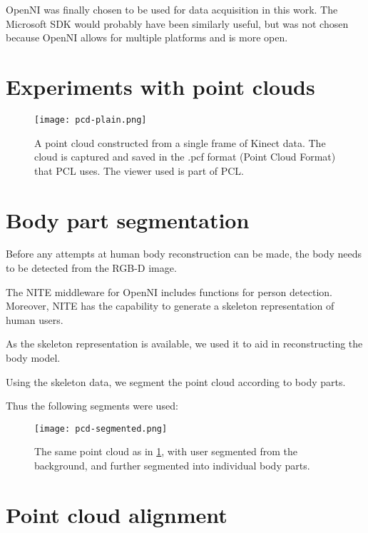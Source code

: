 OpenNI was finally chosen to be used for data acquisition in this work. The Microsoft SDK would probably have been similarly useful, but was not chosen because OpenNI allows for multiple platforms and is more open.

\section{Experiments with point clouds}

\begin{figure}
    \centering
    \texttt{[image: pcd-plain.png]}
    \caption{A point cloud constructed from a single frame of Kinect data. The cloud is captured and saved in the .pcf format (Point Cloud Format) that PCL uses. The viewer used is part of PCL.}
    \label{fig:pcd-plain}
\end{figure}


\section{Body part segmentation}

Before any attempts at human body reconstruction can be made, the body needs to be detected from the RGB-D image. %

The NITE middleware for OpenNI \citep{NITE}
includes functions for person detection. Moreover, NITE has the capability to generate a skeleton representation of human users.

As the skeleton representation is available, we used it to aid in reconstructing the body model.

Using the skeleton data, we segment the point cloud according to body parts.

 Thus the following segments were used:


\begin{figure}
    \centering
    \texttt{[image: pcd-segmented.png]}
    \caption{The same point cloud as in \ref{fig:pcd-plain}, with user segmented from the background, and further segmented into individual body parts.}
    \label{fig:pcd-segmented}
\end{figure}

\section{Point cloud alignment}

